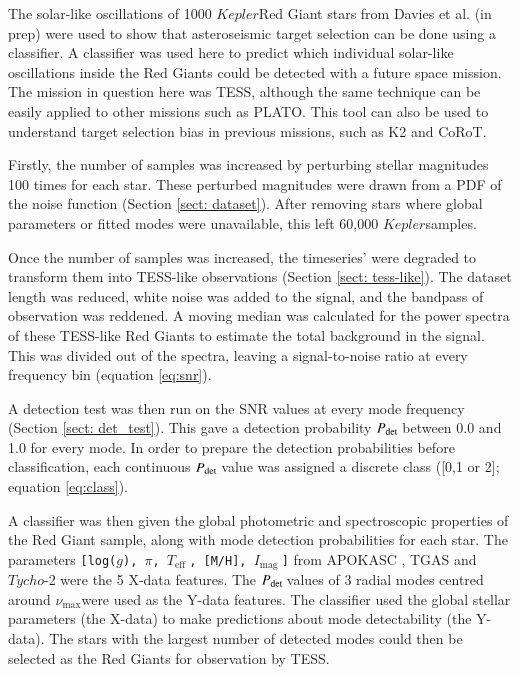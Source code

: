 \documentclass[a4paper,fleqn,usenatbib,useAMS]{mnras}
\newcommand{\numax}{\ensuremath{\nu_{\textrm{max}}}}
\newcommand{\teff}{\ensuremath{T_{\textrm{eff}}\:}}
\newcommand{\kep}{\ensuremath{Kepler}\:}
\newcommand{\pdet}{\ensuremath{P_{\rm det}\:}}
\newcommand{\imag}{\ensuremath{I_{\textrm{mag}}\:}}
\begin{document}
The solar-like oscillations of 1000 \kep Red Giant stars from Davies et al. (in prep) were used to show that asteroseismic target selection can be done using a classifier. A classifier was used here to predict which individual solar-like oscillations inside the Red Giants could be detected with a future space mission. The mission in question here was TESS, although the same technique can be easily applied to other missions such as PLATO. This tool can also be used to understand target selection bias in previous missions, such as K2 and CoRoT.


Firstly, the number of samples was increased by perturbing stellar magnitudes 100 times for each star. These perturbed magnitudes were drawn from a PDF of the noise function (Section \ref{sect: dataset}). After removing stars where global parameters or fitted modes were unavailable, this left 60,000 \kep samples. 

Once the number of samples was increased, the timeseries' were degraded to transform them into TESS-like observations (Section \ref{sect: tess-like}). The dataset length was reduced, white noise was added to the signal, and the bandpass of observation was reddened. A moving median was calculated for the power spectra of these TESS-like Red Giants to estimate the total background in the signal. This was divided out of the spectra, leaving a signal-to-noise ratio at every frequency bin (equation \ref{eq:snr}).

A detection test was then run on the SNR values at every mode frequency (Section \ref{sect: det_test}). This gave a detection probability \pdet between 0.0 and 1.0 for every mode. In order to prepare the detection probabilities before classification, each continuous \pdet value was assigned a discrete class ([0,1 or 2]; equation \ref{eq:class}).

A classifier was then given the global photometric and spectroscopic properties of the Red Giant sample, along with mode detection probabilities for each star. The parameters \texttt{[log($g$), $\pi$, \teff, [M/H], \imag]} from APOKASC \citep{pinsonneault_apokasc_2014}, TGAS \citep{gaia_collaboration_gaia_2016} and $Tycho$-2 \citep{hog_tycho-2_2000} were the 5 X-data features. The \pdet values of 3 radial modes centred around \numax were used as the Y-data features. %
The classifier used the global stellar parameters (the X-data) to make predictions about mode detectability (the Y-data). The stars with the largest number of detected modes could then be selected as the Red Giants for observation by TESS. 
\end{document}
